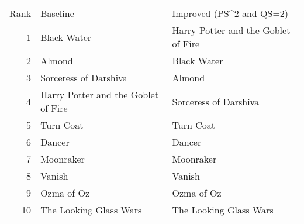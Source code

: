 \begin{tabular}{rll}
Rank & Baseline & Improved (PS^2 and QS=2) \\
1 & Black Water & Harry Potter and the Goblet of Fire \\
2 & Almond & Black Water \\
3 & Sorceress of Darshiva & Almond \\
4 & Harry Potter and the Goblet of Fire & Sorceress of Darshiva \\
5 & Turn Coat & Turn Coat \\
6 & Dancer & Dancer \\
7 & Moonraker & Moonraker \\
8 & Vanish & Vanish \\
9 & Ozma of Oz & Ozma of Oz \\
10 & The Looking Glass Wars & The Looking Glass Wars \\
\end{tabular}
